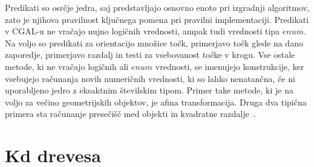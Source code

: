 \documentclass[a4paper, 12pt]{book}
\begin{document}
\bigbreak
Predikati so osrčje jedra, saj predstavljajo osnovno enoto  pri izgradnji algoritmov, zato je njihova pravilnost ključnega pomena pri pravilni implementaciji. Predikati v CGAL-u ne vračajo nujno logičnih vrednosti, ampak tudi vrednosti tipa $enum$. Na voljo so predikati za orientacijo množice točk, primerjavo točk glede na dano zaporedje, primerjavo razdalj in testi za vsebovanost točke v krogu. Vse ostale metode, ki ne vračajo logičnih ali $enum$ vrednosti, se imenujejo konstrukcije, ker vsebujejo računanja novih numeričnih vrednosti, ki so lahko nenatančna, če ni uporabljeno jedro z eksaktnim številskim tipom. Primer take metode, ki je na voljo za večino geometrijskih objektov, je afina transformacija. Druga dva tipična primera sta računanje presečišč med objekti in kvadratne razdalje~\cite{cgal:bfghhkps-lgk23-16b}.

\section{Kd drevesa}
\end{document}
